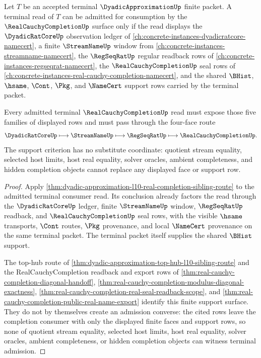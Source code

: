 \begin{theorem}
\label{thm:dyadicapproximation-terminal-real-completion-exit-criterion}
Let $T$ be an accepted terminal $\DyadicApproximationUp$ finite packet. A terminal read of $T$ can be admitted for consumption by the $\RealCauchyCompletionUp$ surface only if the read displays the $\DyadicRatCoreUp$ observation ledger of \autoref{ch:concrete-instances-dyadicratcore-namecert}, a finite $\StreamNameUp$ window from \autoref{ch:concrete-instances-streamname-namecert}, the $\RegSeqRatUp$ regular readback rows of \autoref{ch:concrete-instances-regseqrat-namecert}, the $\RealCauchyCompletionUp$ seal rows of \autoref{ch:concrete-instances-real-cauchy-completion-namecert}, and the shared $\BHist$, $\hsame$, $\Cont$, $\Pkg$, and $\NameCert$ support rows carried by the terminal packet.

Every admitted terminal $\RealCauchyCompletionUp$ read must expose those five families of displayed rows and must pass through the four-face route
$$
\DyadicRatCoreUp \longmapsto \StreamNameUp \longmapsto \RegSeqRatUp \longmapsto \RealCauchyCompletionUp .
$$
The support criterion has no substitute coordinate: quotient stream equality, selected host limits, host real equality, solver oracles, ambient completeness, and hidden completion objects cannot replace any displayed face or support row.
\end{theorem}
\begin{proof}
Apply \autoref{thm:dyadic-approximation-l10-real-completion-sibling-route} to the admitted terminal consumer read. Its conclusion already factors the read through the $\DyadicRatCoreUp$ ledger, finite $\StreamNameUp$ window, $\RegSeqRatUp$ readback, and $\RealCauchyCompletionUp$ seal rows, with the visible $\hsame$ transports, $\Cont$ routes, $\Pkg$ provenance, and local $\NameCert$ provenance on the same terminal packet. The terminal packet itself supplies the shared $\BHist$ support.

The top-hub route of \autoref{thm:dyadic-approximation-top-hub-l10-sibling-route} and the RealCauchyCompletion readback and export rows of \autoref{thm:real-cauchy-completion-diagonal-handoff}, \autoref{thm:real-cauchy-completion-modulus-diagonal-exactness}, \autoref{thm:real-cauchy-completion-real-seal-readback-scope}, and \autoref{thm:real-cauchy-completion-public-real-name-export} identify this finite support surface. They do not by themselves create an admission converse: the cited rows leave the completion consumer with only the displayed finite faces and support rows, so none of quotient stream equality, selected host limits, host real equality, solver oracles, ambient completeness, or hidden completion objects can witness terminal admission.
\end{proof}
